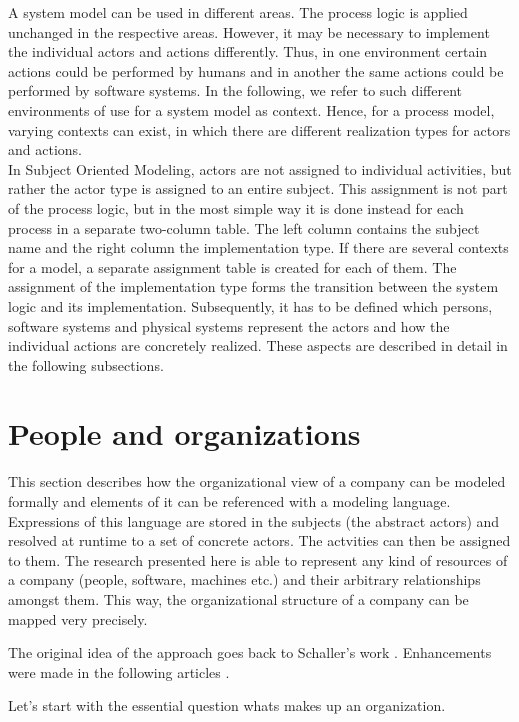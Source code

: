 A system model can be used in different areas. The process logic is applied unchanged in the respective areas. However, it may be necessary to implement the individual actors and actions differently. Thus, in one environment certain actions could be performed by humans and in another the same actions could be performed by software systems. In the following, we refer to such different environments of use for a system model as context. Hence, for a process model, varying contexts can exist, in which there are different realization types for actors and actions.\\
In Subject Oriented Modeling, actors are not assigned to individual activities, but rather the actor type is assigned to an entire subject. This assignment is not part of the process logic, but in the most simple way it is done instead for each process in a separate two-column table. The left column contains the subject name and the right column the implementation type. If there are several contexts for a model, a separate assignment table is created for each of them.
The assignment of the implementation type forms the transition between the system logic and its implementation. Subsequently, it has to be defined which persons, software systems and physical systems represent the actors and how the individual actions are concretely realized. These aspects are described in detail in the following subsections.

\section{People and organizations}

This section describes how the organizational view of a company can be modeled formally and elements of it can be referenced with a modeling language.  Expressions of this language are stored in the subjects (the abstract actors) and resolved at runtime to a set of concrete actors. The actvities can then be assigned to them. 
The research presented here is able to represent any kind of resources of a company (people, software, machines etc.) and their arbitrary relationships amongst them. This way, the organizational structure of a company can be mapped very precisely.

The original idea of the approach goes back to Schaller's work  \cite{Schaller98}. Enhancements were made in the following articles \cite{Lawall2014, Lawall2014a, Lawall2014b, Lawall2014d, Lawall2014c, Lawall2013, Lawall2011}.

Let's start with the essential question whats makes up an organization. 


